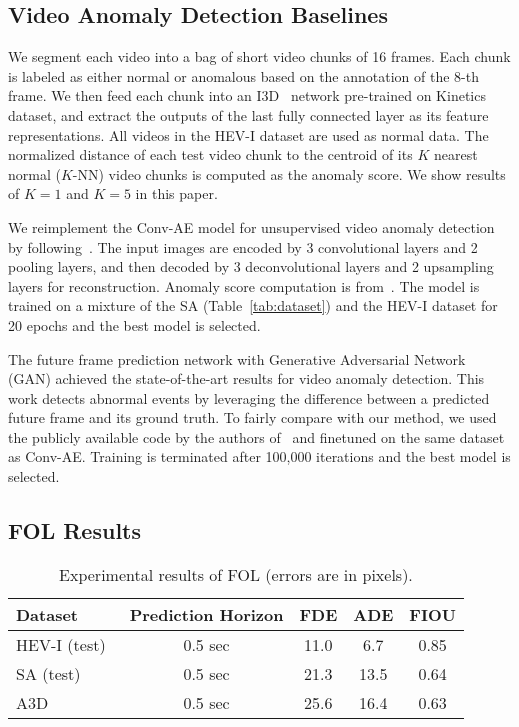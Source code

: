 \documentclass[letterpaper, 10 pt, conference]{ieeeconf}
\theoremstyle{definition}
\theoremstyle{remark}
\begin{document}
\subsection{Video Anomaly Detection Baselines}
We segment each video into a bag of short video chunks of 16 frames. Each 
chunk is labeled as either normal or anomalous based on the
annotation of the 8-th frame. We then feed each chunk into an I3D~\cite{carreira2017quo}
network pre-trained on Kinetics dataset, and extract the outputs
of the last fully connected layer as its feature representations.
All videos in the HEV-I dataset are used as normal data. The normalized distance
of each test video chunk to the centroid of its $K$ nearest normal
($K$-NN) video chunks is computed as the anomaly score. We show
results of $K=1$ and $K=5$ in this paper.

 We reimplement the Conv-AE
model for unsupervised video anomaly detection by
following~\cite{hasan2016learning}.
The input images are encoded by 3
convolutional layers and 2 pooling layers, and then decoded by 3
deconvolutional layers and 2 upsampling layers for
reconstruction.
Anomaly score computation is from~\cite{hasan2016learning}.
The model is trained on a mixture of the SA (Table~\ref{tab:dataset})
and the HEV-I dataset for 20 epochs and the best
model is selected.

The future frame prediction network with Generative Adversarial Network (GAN)
achieved the state-of-the-art results for video anomaly detection.
This work detects abnormal events by
leveraging the difference between a predicted future frame and its
ground truth. To fairly compare with our method, we used
the publicly available code by the authors of~\cite{liu2018future} and finetuned on the same
dataset as Conv-AE. Training is terminated after 100,000 iterations
and the best model is selected.

\subsection{FOL Results}

\begin{table}[t]
    \vspace{5pt}
    \centering
    \renewcommand{\arraystretch}{1.3}
    \caption{Experimental results of FOL (errors are in pixels).}
    \label{tab:fol_result}
    \begin{tabular}{lcccc}
        \toprule
        Dataset  & Prediction Horizon & FDE  & ADE  & FIOU \\
        \midrule 
        HEV-I (test)~\cite{yao2018egocentric} & 0.5 sec & 11.0 & 6.7 & 0.85 \\
        SA (test)~\cite{chan2016anticipating} & 0.5 sec & 21.3 & 13.5 & 0.64 \\
        A3D & 0.5 sec & 25.6 & 16.4 & 0.63 \\
        \bottomrule
    \end{tabular}
    \vspace{-5pt}
\end{table}
\end{document}
